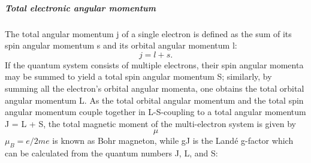 \documentclass{article}
\begin{document}
\subparagraph{Total electronic angular momentum}
The total angular momentum j of a single electron is defined as the
sum of its spin angular momentum s and its orbital angular
momentum l:
\begin{equation}
    j = l + s.
\end{equation}
If the quantum system consists of multiple electrons, their spin
angular momenta may be summed to yield a total spin angular momentum
S; similarly, by summing all the electron’s orbital angular momenta,
one obtains the total orbital angular momentum L. As the total 
orbital angular momentum and the total spin angular momentum couple
together in L-S-coupling to a total angular momentum J = L + S,
the total magnetic moment of the multi-electron system is given by
\begin{equation}
    \mu
\end{equation}
$\mu_B= e/2me$ is known as Bohr magneton, while gJ is the Landé 
g-factor which can be calculated from the quantum numbers J, L, 
and S:
\end{document}

